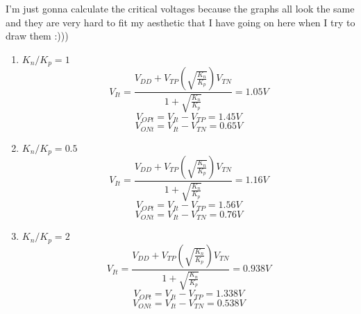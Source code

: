\documentclass{article}
\begin{document}
\begin{enumerate}
\begin{center}
\begin{circuitikz}[scale=1]
            \end{circuitikz}
    \end{center}
    \begin{center}
        I'm just gonna calculate the critical voltages because the graphs all look the same and they are very hard to fit my aesthetic that I have going on here when I try to draw them :)))
    \end{center}
    \begin{enumerate}
        \item $K_n/K_p = 1$
        \begin{equation}
            V_{It} =\frac{V_{DD}+V_{TP}\left(\sqrt{\frac{K_n}{K_p}}\right)V_{TN}}{1+\sqrt{\frac{K_n}{K_p}}} = \boxed{1.05V}
        \end{equation}
        \begin{equation}
            V_{OPt} = V_{It} - V_{TP} =\boxed{1.45V}
        \end{equation}
        \begin{equation}
            V_{ONt} = V_{It} - V_{TN} =\boxed{0.65V}
        \end{equation}
        \item $K_n/K_p = 0.5$
        \begin{equation}
            V_{It} =\frac{V_{DD}+V_{TP}\left(\sqrt{\frac{K_n}{K_p}}\right)V_{TN}}{1+\sqrt{\frac{K_n}{K_p}}} = \boxed{1.16V}
        \end{equation}
        \begin{equation}
            V_{OPt} = V_{It} - V_{TP} =\boxed{1.56V}
        \end{equation}
        \begin{equation}
            V_{ONt} = V_{It} - V_{TN} =\boxed{0.76V}
        \end{equation}
        \item $K_n/K_p = 2$
        \begin{equation}
            V_{It} =\frac{V_{DD}+V_{TP}\left(\sqrt{\frac{K_n}{K_p}}\right)V_{TN}}{1+\sqrt{\frac{K_n}{K_p}}} = \boxed{0.938V}
        \end{equation}
        \begin{equation}
            V_{OPt} = V_{It} - V_{TP} =\boxed{1.338V}
        \end{equation}
        \begin{equation}
            V_{ONt} = V_{It} - V_{TN} =\boxed{0.538 V}
        \end{equation}
    \end{enumerate}

\end{enumerate}
\end{document}
